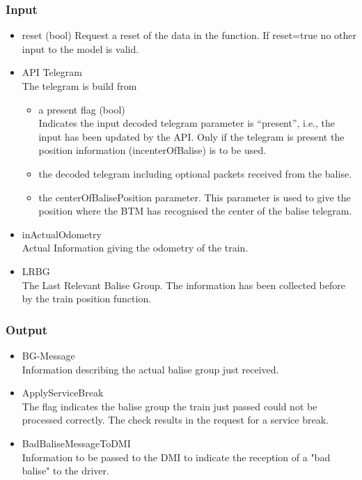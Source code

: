 \documentclass{template/openetcs_report}
\begin{document}
\subsubsection{Input}
\begin{itemize}
\item reset	(bool)	
Request a reset of the data in the function.
If reset=true no other input to the model is valid.
\item API Telegram \\
The telegram is build from 

\begin{itemize}
\item a present flag (bool)\\
Indicates the input decoded telegram parameter is “present”, i.e., the input has been updated by the API.
Only if the telegram is present the position information (incenterOfBalise) is to be used.\\
\item the decoded telegram including optional packets received from the balise.
\item the centerOfBalisePosition parameter. This parameter is used to give the position where the BTM has recognised the center of the balise telegram.
\end{itemize}

\item inActualOdometry\\
Actual Information giving the odometry of the train. 
\item LRBG\\
The Last Relevant Balise Group. The information has been collected before by the train position function.\\
\end{itemize}

\subsubsection{Output}
\begin{itemize}
\item BG-Message\\
Information describing the actual balise group just received.
\item ApplyServiceBreak\\
The flag indicates the balise group the train just passed could not be processed correctly. The check results in the request for a service break.\\
\item BadBaliseMessageToDMI\\
Information to be passed to the DMI to indicate the reception of a "bad balise" to the driver.
\end{itemize}
\end{document}
